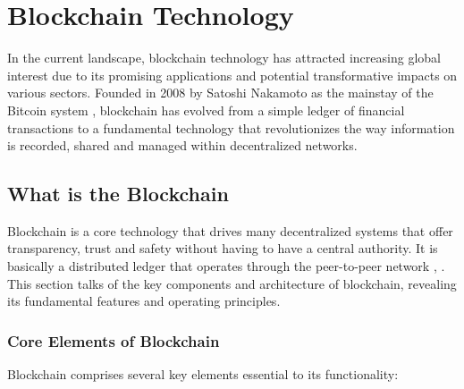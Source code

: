 \chapter{Blockchain Technology} \label{ch:blockchain}

In the current landscape, blockchain technology has attracted increasing global interest due to its promising applications and potential transformative impacts on various 
sectors. Founded in 2008 by Satoshi Nakamoto as the mainstay of the Bitcoin system \cite{9752154}, blockchain has evolved from a simple ledger of financial transactions 
to a fundamental technology that revolutionizes the way information is recorded, shared and managed within decentralized networks.

\section{What is the Blockchain}

Blockchain is a core technology that drives many decentralized systems that offer transparency, trust and safety without having to have a central authority. It is 
basically a distributed ledger that operates through the peer-to-peer network \cite{9596538}, \cite{ibm_blockchain}. This section talks of the key components and architecture of 
blockchain, revealing its fundamental features and operating principles.

\subsection{Core Elements of Blockchain}

Blockchain comprises several key elements essential to its functionality:

